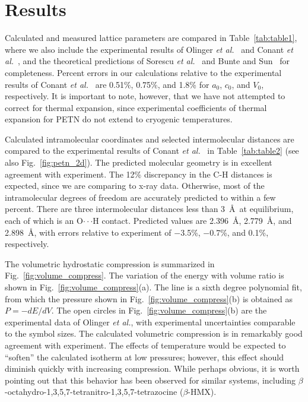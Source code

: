 \documentclass[prb,aps,nobibnotes,twocolumn,doublespace,twocolumngrid,superbib]{revtex4}
\begin{document}
\section{Results}
\label{sec:results}
Calculated and measured lattice parameters are compared in
Table~\ref{tab:table1}, where we also include the experimental results
of Olinger {\it et al.}~\cite{Olinger_1975v62} and Conant {\it et
al.}~\cite{Conant_1979}, and the theoretical predictions of Sorescu
{\it et al.}~\cite{Sorescu_1999v103} and Bunte and
Sun~\cite{Bunte_2000v104} for completeness.  Percent errors in our
calculations relative to the experimental results of Conant {\it et
al.}~\cite{Conant_1979} are 0.51\%, 0.75\%, and 1.8\% for $a_0$,
$c_0$, and $V_0$, respectively.  It is important to note, however,
that we have not attempted to correct for thermal expansion, since
experimental coefficients of thermal expansion for PETN do not extend
to cryogenic temperatures.

Calculated intramolecular coordinates and selected intermolecular
distances are compared to the experimental results of Conant {\it et
al.}~\cite{Conant_1979} in Table~\ref{tab:table2} (see also 
Fig.~\ref{fig:petn_2d}).  The predicted
molecular geometry is in excellent agreement with experiment.  The
12\% discrepancy in the C-H distances is expected, since we are
comparing to x-ray data.  Otherwise, most of the intramolecular
degrees of freedom are accurately predicted to within a few percent.
There are three intermolecular distances less than 3~\AA\ at
equilibrium, each of which is an O$\cdot\cdot\cdot$H contact.
Predicted values are 2.396~\AA, 2.779~\AA, and 2.898~\AA, with errors
relative to experiment of $-$3.5\%, $-$0.7\%, and 0.1\%, respectively.

The volumetric hydrostatic compression is summarized in
Fig.~\ref{fig:volume_compress}.  The variation of the energy with
volume ratio is shown in Fig.~\ref{fig:volume_compress}(a).  The line
is a sixth degree polynomial fit, from which the pressure shown in
Fig.~\ref{fig:volume_compress}(b) is obtained as $P=-dE/dV$.  The open
circles in Fig.~\ref{fig:volume_compress}(b) are the experimental data
of Olinger {\it et al.}, with experimental uncertainties comparable to
the symbol sizes.  The calculated volumetric compression is in
remarkably good agreement with experiment.  The effects of temperature
would be expected to ``soften'' the calculated isotherm at low
pressures;  however, this effect should diminish quickly with
increasing compression. While perhaps obvious, it is worth pointing out
that this behavior has been observed for similar systems, including 
$\beta$-octahydro-1,3,5,7-tetranitro-1,3,5,7-tetrazocine
($\beta$-HMX)\cite{Gump_2003,Sewell03_unpublished}.
\end{document}

